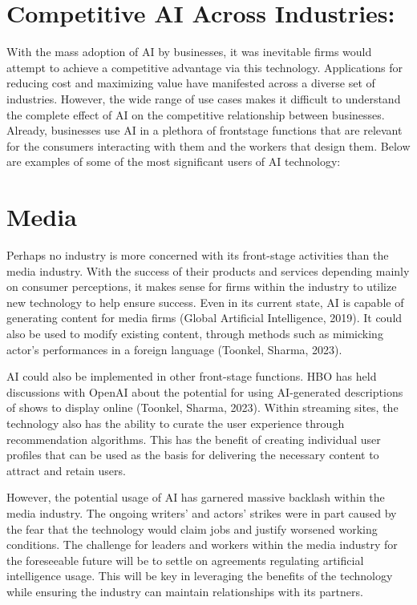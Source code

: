 \documentclass[
]{book}
\begin{document}
\hypertarget{competitive-ai-across-industries-1}{%
\section{Competitive AI Across Industries:}\label{competitive-ai-across-industries-1}}

With the mass adoption of AI by businesses, it was inevitable firms would attempt to achieve a competitive advantage via this technology. Applications for reducing cost and maximizing value have manifested across a diverse set of industries. However, the wide range of use cases makes it difficult to understand the complete effect of AI on the competitive relationship between businesses. Already, businesses use AI in a plethora of frontstage functions that are relevant for the consumers interacting with them and the workers that design them. Below are examples of some of the most significant users of AI technology:

\hypertarget{media-1}{%
\section{Media}\label{media-1}}

Perhaps no industry is more concerned with its front-stage activities than the media industry. With the success of their products and services depending mainly on consumer perceptions, it makes sense for firms within the industry to utilize new technology to help ensure success. Even in its current state, AI is capable of generating content for media firms (Global Artificial Intelligence, 2019). It could also be used to modify existing content, through methods such as mimicking actor's performances in a foreign language (Toonkel, Sharma, 2023).

AI could also be implemented in other front-stage functions. HBO has held discussions with OpenAI about the potential for using AI-generated descriptions of shows to display online (Toonkel, Sharma, 2023). Within streaming sites, the technology also has the ability to curate the user experience through recommendation algorithms. This has the benefit of creating individual user profiles that can be used as the basis for delivering the necessary content to attract and retain users.

However, the potential usage of AI has garnered massive backlash within the media industry. The ongoing writers' and actors' strikes were in part caused by the fear that the technology would claim jobs and justify worsened working conditions. The challenge for leaders and workers within the media industry for the foreseeable future will be to settle on agreements regulating artificial intelligence usage. This will be key in leveraging the benefits of the technology while ensuring the industry can maintain relationships with its partners.
\end{document}
